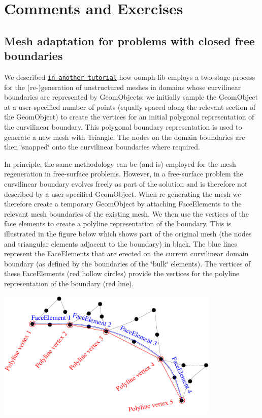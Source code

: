  

\hypertarget{index_comments}{}\section{Comments and Exercises}\label{index_comments}
\hypertarget{index_adapt}{}\subsection{Mesh adaptation for problems with \textquotesingle{}closed\textquotesingle{} free boundaries}\label{index_adapt}
We described \href{../../../meshes/mesh_from_inline_triangle/html/index.html}{\tt in another tutorial} how {\ttfamily oomph-\/lib} employs a two-\/stage process for the (re-\/)generation of unstructured meshes in domains whose curvilinear boundaries are represented by {\ttfamily Geom\+Objects\+:} we initially sample the {\ttfamily Geom\+Object} at a user-\/specified number of points (equally spaced along the relevant section of the {\ttfamily Geom\+Object}) to create the vertices for an initial polygonal representation of the curvilinear boundary. This polygonal boundary representation is used to generate a new mesh with {\ttfamily Triangle}. The nodes on the domain boundaries are then \char`\"{}snapped\char`\"{} onto the curvilinear boundaries where required.

In principle, the same methodology can be (and is) employed for the mesh regeneration in free-\/surface problems. However, in a free-\/surface problem the curvilinear boundary evolves freely as part of the solution and is therefore not described by a user-\/specified {\ttfamily Geom\+Object}. When re-\/generating the mesh we therefore create a temporary {\ttfamily Geom\+Object} by attaching {\ttfamily Face\+Elements} to the relevant mesh boundaries of the existing mesh. We then use the vertices of the face elements to create a polyline representation of the boundary. This is illustrated in the figure below which shows part of the original mesh (the nodes and triangular elements adjacent to the boundary) in black. The blue lines represent the {\ttfamily Face\+Elements} that are erected on the current curvilinear domain boundary (as defined by the boundaries of the \char`\"{}bulk\char`\"{} elements). The vertices of these {\ttfamily Face\+Elements} (red hollow circles) provide the vertices for the polyline representation of the boundary (red line).

 
\begin{DoxyImage}
\includegraphics[width=0.8\textwidth]{remesh_1}
\end{DoxyImage}


